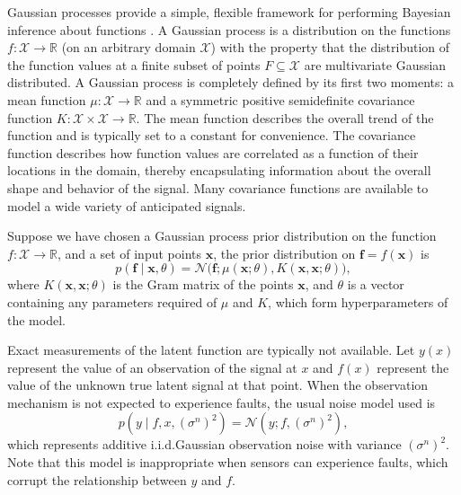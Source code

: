 \documentclass[letterpaper]{article}
\newcommand{\R}{\ensuremath{\mathbb{R}}}
\newcommand{\deq}{=}
\newcommand{\given}{\!\ensuremath{\mid}\!}
\newcommand{\cm}[1]{\ensuremath{\mathcal{#1}}}
\newcommand{\bm}[1]{\ensuremath{\mathbf{#1}}}
\begin{document}
Gaussian processes provide a simple, flexible framework for performing
Bayesian inference about functions \cite{gpml}.  A Gaussian process
is a distribution on the functions $f\colon \cm{X} \to \R$ (on an
arbitrary domain $\cm{X}$) with the property that the distribution of
the function values at a finite subset of points $F \subseteq \cm{X}$
are multivariate Gaussian distributed. A Gaussian process is completely defined by its first two moments: a
mean function $\mu\colon \cm{X} \to \R$ and a symmetric positive
semidefinite covariance function $K\colon \cm{X} \times \cm{X} \to
\R$.  The mean function describes the overall trend of the function
and is typically set to a constant for convenience.  The covariance
function describes how function values are correlated as a function of
their locations in the domain, thereby encapsulating information about
the overall shape and behavior of the signal.  Many covariance
functions are available to model a wide variety of anticipated
signals.

Suppose we have chosen a Gaussian process prior distribution on the
function $f\colon \cm{X} \to \R$, and a set of input points $\bm{x}$,
the prior distribution on $\bm{f} \deq f(\bm{x})$ is
\begin{equation*}
 p(\bm{f} \given \bm{x}, \theta)
 =
 \cm{N}
 \bigl(
   \bm{f};
   \mu(\bm{x}; \theta),
   K(\bm{x}, \bm{x}; \theta)
 \bigr),
\end{equation*}
where $K(\bm{x}, \bm{x}; \theta)$ is the Gram matrix of the points
$\bm{x}$, and $\theta$ is a vector containing any parameters required
of $\mu$ and $K$, which form hyperparameters of the model.

Exact measurements of the latent function are typically not available.
Let $y(x)$ represent the
value of an observation of the signal at $x$ and $f(x)$
represent the value of the unknown true latent signal at that point.
When the observation mechanism is not expected to experience faults,
the usual noise model used is
\begin{equation}\label{iidnoise}
 p(y \given f, x, (\sigma^n)^2)
 \deq
 \cm{N}(y; f, (\sigma^n)^2),
\end{equation}
which represents additive i.i.d.\space Gaussian observation noise with
variance $(\sigma^n)^2$. Note that this model is inappropriate when
sensors can experience faults, which corrupt the relationship
between $y$ and $f$.
\end{document}
